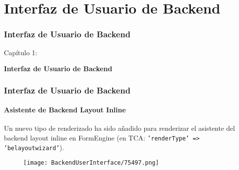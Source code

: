%

\section{Interfaz de Usuario de Backend}
\begin{frame}[fragile]
	\frametitle{Interfaz de Usuario de Backend}

	\begin{center}\huge{Capítulo 1:}\end{center}
	\begin{center}\huge{\color{typo3darkgrey}\textbf{Interfaz de Usuario de Backend}}\end{center}

\end{frame}

\begin{frame}[fragile]
	\frametitle{Interfaz de Usuario de Backend}
	\framesubtitle{Asistente de Backend Layout Inline}

	Un nuevo tipo de renderizado ha sido añadido para renderizar el asistente del backend layout inline en FormEngine
	(en TCA: \texttt{'renderType' => 'belayoutwizard'}).

	\begin{figure}
		\texttt{[image: BackendUserInterface/75497.png]}
	\end{figure}

\end{frame}



